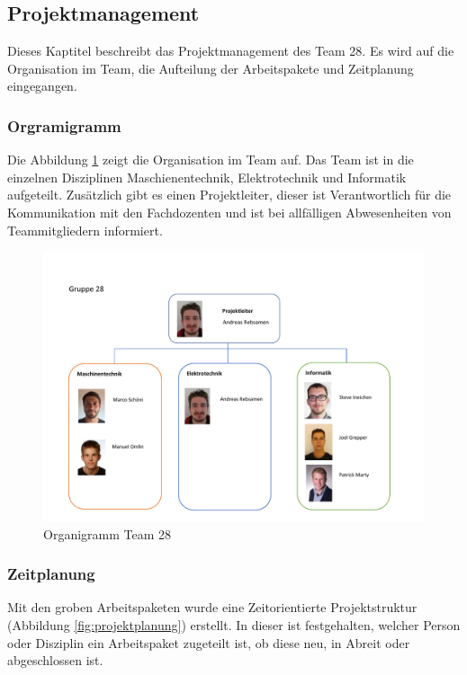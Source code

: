 \documentclass[../../main.tex]{subfiles}
\begin{document}
\subsection{Projektmanagement}
Dieses Kaptitel beschreibt das Projektmanagement des Team 28. Es wird auf die Organisation im Team, die Aufteilung der Arbeitspakete und Zeitplanung eingegangen.

\subsubsection{Orgramigramm}
Die Abbildung \ref{fig:organigramm} zeigt die Organisation im Team auf. Das Team ist in die einzelnen Disziplinen Maschienentechnik, Elektrotechnik und Informatik aufgeteilt. Zusätzlich gibt es einen Projektleiter, dieser ist Verantwortlich für die Kommunikation mit den Fachdozenten und ist bei allfälligen Abwesenheiten von Teammitgliedern informiert.


\begin{figure}[H] \centering
    \includegraphics[page=1,width=.9\textwidth, trim=1cm .5cm 1cm 3.2cm, clip]{Organigramm.pdf}
    \caption{Organigramm Team 28}
    \label{fig:organigramm}
\end{figure}

\subsubsection{Zeitplanung}
Mit den groben Arbeitspaketen wurde eine Zeitorientierte Projektstruktur (Abbildung \ref{fig:projektplanung}) erstellt. In dieser ist festgehalten, welcher Person oder Disziplin ein Arbeitspaket zugeteilt ist, ob diese neu, in Abreit oder abgeschlossen ist. \\
\end{document}
